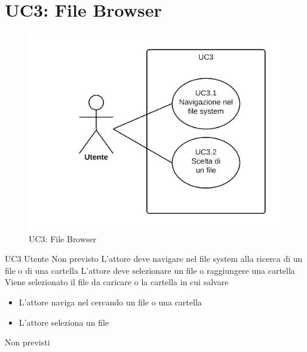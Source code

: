 \documentclass[../AnalisideiRequisiti.tex]{subfiles}
\begin{document}
	\section{UC3: File Browser}
	\begin{figure}[H]
		\centering
		\includegraphics[width=\textwidth]{../img/UC3.png}
		\caption{UC3: File Browser}
	\end{figure}
	\UserCase
	{UC3}
	{Utente}
	{Non previsto}
	{L'attore deve navigare nel file system alla ricerca di un file o di una cartella}
	{L'attore deve selezionare un file o raggiungere una cartella}
	{Viene selezionato il file da caricare o la cartella in cui salvare}
	{
		\begin{itemize}
			\item{} L'attore naviga nel  cercando un file o una cartella 
			\item{} L'attore seleziona un file 
		\end{itemize}
	}
	{Non previsti}
	
\end{document}
